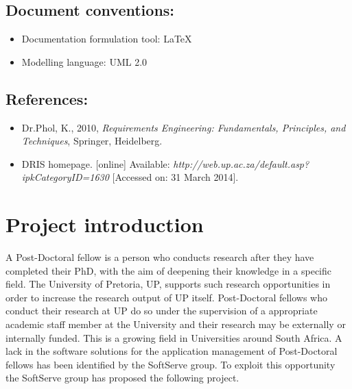 \documentclass[12pt]{article}
\begin{document}
\vspace{0.5in}

\subsection{Document conventions:}
\vspace{0.1in}
\begin{itemize}
\item Documentation formulation tool: LaTeX
\item Modelling language: UML 2.0
\end{itemize}

\vspace{0.2in}

\subsection{References:}
\vspace{0.1in}
\begin{itemize}
\item Dr.Phol, K., 2010, \textit{Requirements Engineering: Fundamentals, Principles, and Techniques}, Springer, Heidelberg.
\item DRIS homepage. [online] Available: \textit{http://web.up.ac.za/default.asp?ipkCategoryID=1630} [Accessed on: 31 March 2014].
\end{itemize}	

\vspace{0.5in}

\newpage
\section{Project introduction}
A Post-Doctoral fellow is a person who conducts research after they have completed their PhD, with the aim of deepening their knowledge in a specific field. The University of Pretoria, UP, supports such research opportunities in order to increase the research output of UP itself. Post-Doctoral fellows who conduct their research at UP do so under the supervision of a appropriate academic staff member at the University and their research may be externally or internally funded. This is a growing field in Universities around South Africa. A lack in the software solutions for the application management of Post-Doctoral fellows has been identified by the SoftServe group. To exploit this opportunity the SoftServe group has proposed the following project.
 
\vspace{0.2in}
\end{document}
